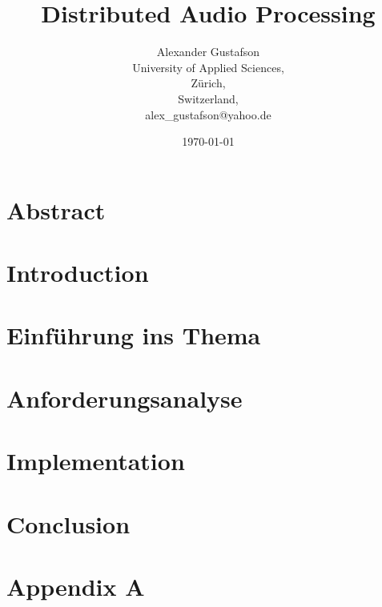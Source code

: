 \documentclass{report}
\begin{document}
\title{Distributed Audio Processing}
\author{Alexander Gustafson\\
  University of Applied Sciences,\\
  Zürich,\\
  Switzerland,\\
  alex\_gustafson@yahoo.de}
\date{\today}
\maketitle

\chapter*{Abstract}



\tableofcontents

\chapter{Introduction}



\chapter{Einführung ins Thema}






\chapter{Anforderungsanalyse}







\chapter{Implementation}











\chapter{Conclusion}




{}


\chapter{Appendix A}



\end{document}
